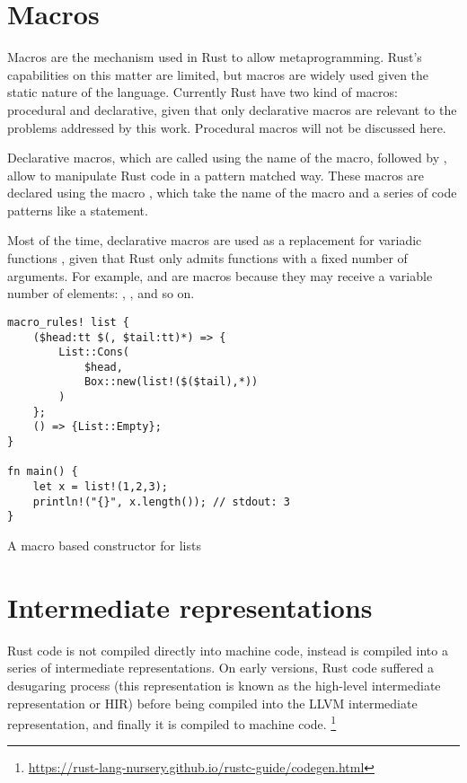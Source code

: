 \section{Macros}

Macros are the mechanism used in Rust to allow metaprogramming. Rust's
capabilities on this matter are limited, but macros are widely used given the
static nature of the language. Currently Rust have two kind of macros:
procedural and declarative, given that only declarative macros are relevant to
the problems addressed by this work. Procedural macros will not be discussed
here.

Declarative macros, which are called using the name of the macro, followed by
\inrust{!}, allow to manipulate Rust code in a pattern matched way. These
macros are declared using the macro , which take the name
of the macro and a series of code patterns like a  statement. 

Most of the time, declarative macros are used as a replacement for variadic functions
, given that Rust only admits functions with a fixed
number of arguments. For example,  and  are macros
because they may receive a variable number of elements: ,
,   and so on.


\begin{listing}[ht]
	\begin{verbatim}
macro_rules! list {
    ($head:tt $(, $tail:tt)*) => {
        List::Cons(
            $head, 
            Box::new(list!($($tail),*))
        )
    };
    () => {List::Empty};
}

fn main() {
    let x = list!(1,2,3);
    println!("{}", x.length()); // stdout: 3
}
    \end{verbatim}
  \caption{A macro based constructor for lists}
  \label{lst:declarative_macro}
\end{listing}

\section{Intermediate representations}

Rust code is not compiled directly into machine code, instead is compiled into a
series of intermediate representations. On early versions, Rust code suffered a
desugaring process (this representation is known as the high-level intermediate
representation or HIR) before being compiled into the LLVM intermediate
representation, and finally it is compiled to machine code.
\footnote{\url{https://rust-lang-nursery.github.io/rustc-guide/codegen.html}}

